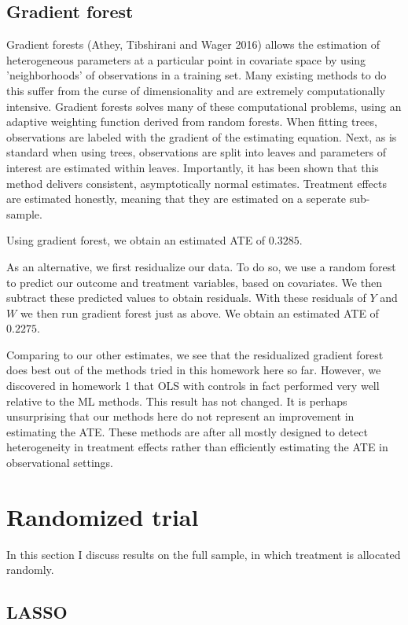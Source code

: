 \documentclass[paper=letter, fontsize=11pt]{scrartcl} %
\begin{document}
\subsection{Gradient forest}

Gradient forests (Athey, Tibshirani and Wager 2016) allows the estimation of heterogeneous parameters at a particular point in covariate space by using 'neighborhoods' of observations in a training set. Many existing methods to do this suffer from the curse of dimensionality and are extremely computationally intensive. Gradient forests solves many of these computational problems, using an adaptive weighting function derived from random forests. When fitting trees, observations are labeled with the gradient of the estimating equation. Next, as is standard when using trees, observations are split into leaves and parameters of interest are estimated within leaves. Importantly, it has been shown that this method delivers consistent, asymptotically normal estimates. Treatment effects are estimated honestly, meaning that they are estimated on a seperate sub-sample.

Using gradient forest, we obtain an estimated ATE of $0.3285$.

As an alternative, we first residualize our data. To do so, we use a random forest to predict our outcome and treatment variables, based on covariates. We then subtract these predicted values to obtain residuals. With these residuals of $Y$ and $W$ we then run gradient forest just as above. We obtain an estimated ATE of $0.2275$.

Comparing to our other estimates, we see that the residualized gradient forest does best out of the methods tried in this homework here so far. However, we discovered in homework 1 that OLS with controls in fact performed very well relative to the ML methods. This result has not changed. It is perhaps unsurprising that our methods here do not represent an improvement in estimating the ATE. These methods are after all mostly designed to detect heterogeneity in treatment effects rather than efficiently estimating the ATE in observational settings.


\section{Randomized trial}

In this section I discuss results on the full sample, in which treatment is allocated randomly.

\subsection{LASSO}
\end{document}
